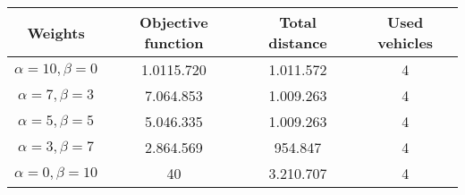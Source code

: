 {
\renewcommand{\arraystretch}{2}
\begin{longtable}[h]{| c | c | c | c |}
    \hline
    \textbf{Weights} & \textbf{Objective function} & \textbf{Total distance} & \textbf{Used vehicles} \\
    \hline
    \endhead
    $\alpha = 10, \beta = 0$ & 1.0115.720 & 1.011.572 & 4 \\
    \hline
    $\alpha = 7, \beta = 3$  &  7.064.853 & 1.009.263 & 4 \\
    \hline
    $\alpha = 5, \beta = 5$  &  5.046.335 & 1.009.263 & 4 \\
    \hline
    $\alpha = 3, \beta = 7$  &  2.864.569 &   954.847 & 4 \\
    \hline
    $\alpha = 0, \beta = 10$ &         40 & 3.210.707 & 4 \\
    \hline
\end{longtable}
}
